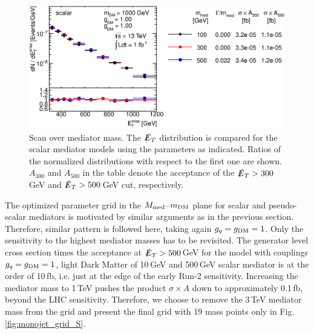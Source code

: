 \begin{figure}
\centering
\includegraphics[width=0.9\linewidth]{figures/monojet/scan_mMed_S_1000.eps}
\caption{Scan over mediator mass. The $\slashed{E}_T$ distribution is compared for the scalar mediator models using the parameters as indicated. Ratios of the normalized distributions with respect to the first one are shown. $A_{300}$ and $A_{500}$ in the table denote the acceptance of the $\slashed{E}_T>300$\,GeV and $\slashed{E}_T>500$\,GeV cut, respectively.}
\label{fig:monojet_scan_S_mMed1000}
\end{figure}


The optimized parameter grid in the $M_{\rm{med}}$--$m_{\rm{DM}}$ plane for scalar and pseudo-scalar mediators is motivated by similar arguments as in the previous section. Therefore, similar pattern is followed here, taking again $g_q=g_{\rm{DM}}=1$. Only the sensitivity to the highest mediator masses has to be revisited.
The generator level cross section times the acceptance at $\slashed{E}_T>500$\,GeV for the model with couplings $g_q=g_{\rm{DM}}=1$, light Dark Matter of 10\,GeV and 500\,GeV scalar mediator is at the order of 10\,fb, i.e. just at the edge of the early Run-2 sensitivity. Increasing the mediator mass to 1\,TeV pushes the product $\sigma\times A$ down to approximately 0.1\,fb, beyond the LHC sensitivity. Therefore, we choose to remove the 3\,TeV mediator mass from the grid and present the final grid with 19 mass points only in Fig.\,\ref{fig:monojet_grid_S}.

